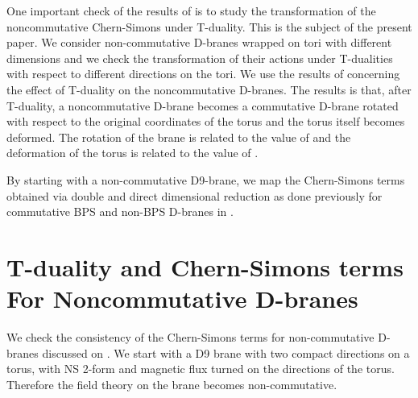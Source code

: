 \documentclass[a4paper,12pt]{article}
\begin{document}
One important check of the results of \cite{ms} is to study the transformation
of the noncommutative Chern-Simons under T-duality.  
This is the subject of the present paper. We consider non-commutative 
D-branes wrapped on tori with different dimensions and we check the 
transformation of their actions under
T-dualities with respect to different directions on the tori. 
We use the results of \cite{chu,chen,ima,blu1,blu2,blu3} 
concerning the effect of
T-duality on the noncommutative D-branes. 
The results is that, after T-duality, a 
noncommutative D-brane becomes a commutative D-brane rotated with respect to
the original coordinates of the torus and the torus itself becomes deformed.
The rotation of the brane is related to the value of \coordHE{} and the 
deformation of the torus is related to the value of \coordHE{}.  

By starting with a non-commutative D9-brane, we map the Chern-Simons terms
obtained 
via double and direct dimensional 
reduction as done previously for commutative 
BPS and non-BPS D-branes in \cite{al,b1,ga,b2,jm}.

\section{T-duality and Chern-Simons terms For Noncommutative D-branes}
We check the consistency of the Chern-Simons terms for
non-commutative D-branes discussed on \cite{ms}. 
We start with a D9 brane with two compact directions 
on a \coordHE{} torus, with NS 2-form \coordHE{}  and magnetic flux \coordHE{} turned on the
directions of the torus.
Therefore the field theory on the brane becomes non-commutative. 
\end{document}

